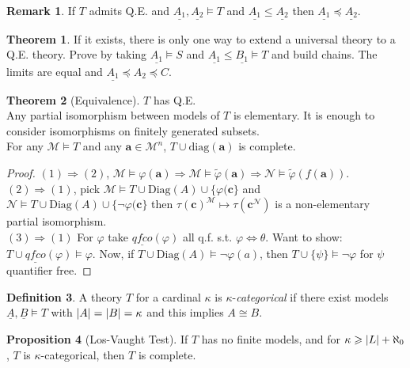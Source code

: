 \documentclass[a4paper,10pt]{article}
\theoremstyle{definition}
\newtheorem{theorem}{Theorem}
\newtheorem*{remark}{Remark}
\DeclarePairedDelimiter\abs{\lvert}{\rvert}
\newtheorem{definition}[theorem]{Definition}
\newtheorem{proposition}[theorem]{Proposition}
\let\vec\mathbf
\let\phi\varphi
\let\preceq\preccurlyeq
\let\implies\Rightarrow
\begin{document}
\begin{remark}
    If $T$ admits Q.E. and $\underline{A_1},\underline{A_2} \models T$ and $ \underline{A_1} \leqslant \underline{A_2}$ then $\underline{A_1} \preceq \underline{A_2}$.
\end{remark}

\begin{theorem}
    If it exists, there is only one way to extend a universal theory to a Q.E. theory. Prove by taking $\underline{A_1} \models S$ and $\underline{A_1} \leqslant \underline{B_1} \models T$ and build chains. The limits are equal and $\underline{A_1} \preceq A_2 \preceq C$.
\end{theorem}

\begin{theorem}[Equivalence]
    $T$ has Q.E.\\ Any partial isomorphism between models of $T$ is elementary. It is enough to consider isomorphisms on finitely generated subsets.
    \\ For any $\mathcal{M} \models T$ and any $\vec{a} \in \mathcal{M}^n$, $T \cup \mathrm{diag}(\vec{a})$ is complete.
\end{theorem}

\begin{proof}
    $(1) \implies (2)$, $\mathcal{M} \models \phi(\vec{a}) \implies \mathcal{M} \models \tilde{\phi}(\vec{a}) \implies \mathcal{N} \models \tilde{\phi}(f(\vec{a}))$. \\
    $(2) \implies (1)$, pick $\mathcal{M} \models T \cup \mathrm{Diag}(A) \cup \{\phi(\vec{c}\}$ and $\mathcal{N} \models T \cup \mathrm{Diag}(A) \cup \{ \neg\phi(\vec{c}\}$ then $\tau(\vec{c})^\mathcal{M} \mapsto \tau(\vec{c}^\mathcal{N})$ is a non-elementary partial isomorphism. \\ 
    $(3) \implies (1)$ For $\phi$ take $\underline{qfco}(\phi)$ all q.f. s.t. $\phi \iff \theta$. Want to show: $T \cup \underline{qfco}(\phi) \models \phi$. Now, if $T \cup \mathrm{Diag}(A) \models \neg \phi(a)$, then $T \cup \{\psi\} \models \neg \phi$ for $\psi$ quantifier free.
\end{proof}

\begin{definition}
    A theory $T$ for a cardinal $\kappa$ is $\kappa$-\emph{categorical} if there exist models $\underline{A}, \underline{B} \models T$ with $\abs{A} = \abs{B} = \kappa$ and this implies $A \cong B$.
\end{definition}

\begin{proposition}[Los-Vaught Test]
    If $T$ has no finite models, and for $\kappa \geqslant \abs{L} + \aleph_0$, $T$ is $\kappa$-categorical, then $T$ is complete.
\end{proposition}
\end{document}
